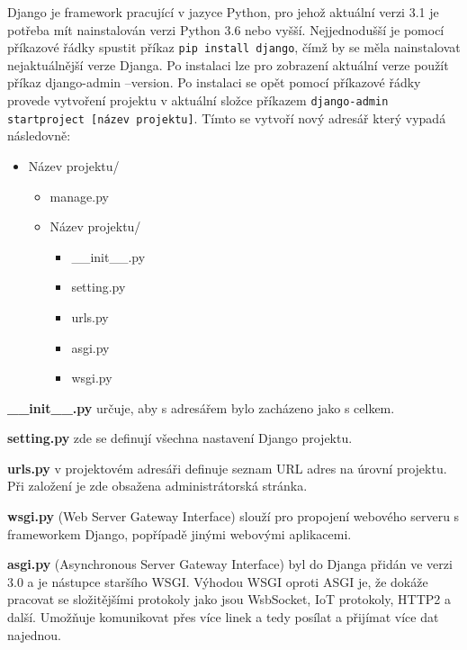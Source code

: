 Django je framework pracující v jazyce Python, pro jehož aktuální
verzi 3.1 je potřeba mít nainstalován verzi Python 3.6 nebo
vyšší. Nejjednodušší je pomocí příkazové řádky spustit příkaz {\tt pip
install django}, čímž by se měla nainstalovat nejaktuálnější verze
Djanga. Po instalaci lze pro zobrazení aktuální verze použít příkaz
django-admin --version. Po instalaci se opět pomocí příkazové řádky
provede vytvoření projektu v aktuální složce příkazem {\tt django-admin
startproject [název projektu]}. Tímto se vytvoří nový adresář který
vypadá následovně:

\begin{itemize}
	\item \lbrack Název projektu\rbrack /
	\begin{itemize}
		\item manage.py
		\item \lbrack Název projektu\rbrack /
		\begin{itemize}
			\item \_\_init\_\_.py
			\item setting.py
			\item urls.py
			\item asgi.py
			\item wsgi.py
		\end{itemize}
	\end{itemize}
\end{itemize}

\vspace{6px}

\textbf{\_\_init\_\_.py} určuje, aby s adresářem bylo zacházeno jako s celkem.
\vspace{6px}

\textbf{setting.py} zde se definují všechna nastavení Django projektu. 
\vspace{6px}

\textbf{urls.py} v projektovém adresáři definuje seznam URL adres na
úrovní projektu. Při založení je zde obsažena administrátorská
stránka.  \vspace{6px}

\textbf{wsgi.py} (Web Server Gateway Interface) slouží pro propojení
webového serveru s frameworkem Django, popřípadě jinými webovými
aplikacemi.  \vspace{6px}

\textbf{asgi.py} (Asynchronous Server Gateway Interface) byl do Djanga
přidán ve verzi 3.0 a je nástupce staršího WSGI. Výhodou WSGI oproti
ASGI je, že dokáže pracovat se složitějšími protokoly jako jsou
WsbSocket, IoT protokoly, HTTP2 a další. Umožňuje komunikovat přes
více linek a tedy posílat a přijímat více dat najednou.  \vspace{6px}

